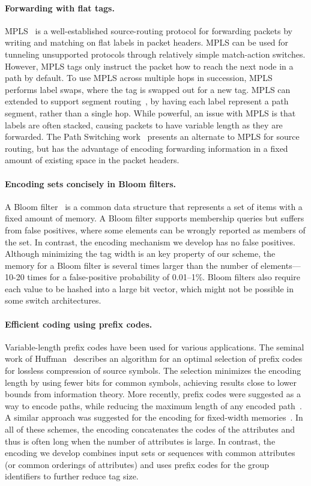 \paragraph{Forwarding with flat tags.}
MPLS~\cite{mpls} is a well-established source-routing protocol for forwarding 
packets by writing and matching on flat labels in packet headers. MPLS can
 be used for tunneling unsupported protocols through relatively simple 
 match-action switches. However, MPLS tags only instruct the packet 
 how to reach the next node in a path by default. To use MPLS across 
 multiple hops in succession, MPLS performs label swaps, where the tag is
  swapped out for a new tag. MPLS can extended to support segment routing~\cite{segmentrouting}, 
  by having each label represent a path segment, rather than a single hop. 
While powerful, an issue with MPLS is that labels are often stacked, causing 
packets to have variable length as they are forwarded. The Path Switching work~\cite{pathswitching} presents an alternate to MPLS for source routing, 
but has the advantage of encoding forwarding information in a fixed amount 
of existing space in the packet headers. 

\paragraph{Encoding sets concisely in Bloom filters.} A Bloom
filter~\cite{Bloom} is a common data structure that represents a set of
items with a fixed amount of memory. A Bloom filter supports membership
queries but suffers from false positives, where some elements can be
wrongly reported as members of the set. In contrast, the encoding
mechanism we develop has no false positives.  Although minimizing the
tag width is an key property of our scheme, the memory for a Bloom
filter is several times larger than the number of elements---10-20 times
for a false-positive probability of 0.01--1\%. Bloom filters also
require each value to be hashed into a large bit vector, which might not
be possible in some switch architectures.

\paragraph{Efficient coding using prefix codes.} Variable-length prefix
codes have been used for various applications. The seminal work of
Huffman~\cite{Huffman} describes an algorithm for an optimal selection
of prefix codes for lossless compression of source symbols. The
selection minimizes the encoding length by using fewer bits for common
symbols, achieving results close to lower bounds from information
theory. More recently, prefix codes were suggested as a way to encode
paths, while reducing the maximum length of any encoded
path~\cite{PathEncoding}. A similar approach was suggested for the
encoding for fixed-width memories~\cite{FixedMemories}. In all of these
schemes, the encoding concatenates the codes of the attributes and thus
is often long when the number of attributes is large. In contrast, the
encoding we develop
combines input sets or sequences with common attributes (or
common orderings of attributes) and uses prefix codes for the
group identifiers to further reduce tag size.
